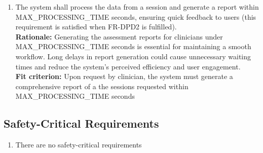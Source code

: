 \documentclass[12pt]{article}
\begin{document}
\begin{enumerate}[label={PR-SL}4. ]
  \item The system shall process the data from a session and generate a report within MAX\_PROCESSING\_TIME seconds, ensuring quick feedback to users (this requirement is satisfied when FR-DPD2 is fulfilled).\\
  \textbf{Rationale: }Generating the assessment reports for clinicians under MAX\_PROCESSING\_TIME seconds is essential for maintaining a smooth workflow. Long delays in report generation could cause unnecessary waiting times and reduce the system's perceived efficiency and user engagement.\\
  \textbf{Fit criterion: }Upon request by clinician, the system must generate a comprehensive report of a the sessions requested within\\ MAX\_PROCESSING\_TIME seconds  
\end{enumerate}

\subsection{Safety-Critical Requirements}
\begin{enumerate}[label={PR-SCL}1. ]
  \item There are no safety-critical requirements
\end{enumerate}
\end{document}
